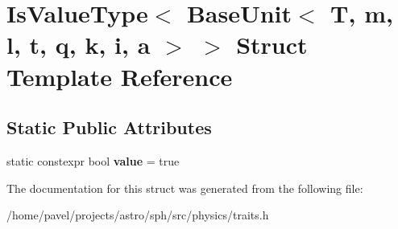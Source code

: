 \hypertarget{structIsValueType_3_01BaseUnit_3_01T_00_01m_00_01l_00_01t_00_01q_00_01k_00_01i_00_01a_01_4_01_4}{}\section{Is\+Value\+Type$<$ Base\+Unit$<$ T, m, l, t, q, k, i, a $>$ $>$ Struct Template Reference}
\label{structIsValueType_3_01BaseUnit_3_01T_00_01m_00_01l_00_01t_00_01q_00_01k_00_01i_00_01a_01_4_01_4}
\subsection*{Static Public Attributes}
\begin{DoxyCompactItemize}
\item 
\hypertarget{structIsValueType_3_01BaseUnit_3_01T_00_01m_00_01l_00_01t_00_01q_00_01k_00_01i_00_01a_01_4_01_4_ab786a9e7f07c8766865bd690435b3fd9}{}\label{structIsValueType_3_01BaseUnit_3_01T_00_01m_00_01l_00_01t_00_01q_00_01k_00_01i_00_01a_01_4_01_4_ab786a9e7f07c8766865bd690435b3fd9} 
static constexpr bool {\bfseries value} = true
\end{DoxyCompactItemize}


The documentation for this struct was generated from the following file\+:\begin{DoxyCompactItemize}
\item 
/home/pavel/projects/astro/sph/src/physics/traits.\+h\end{DoxyCompactItemize}
